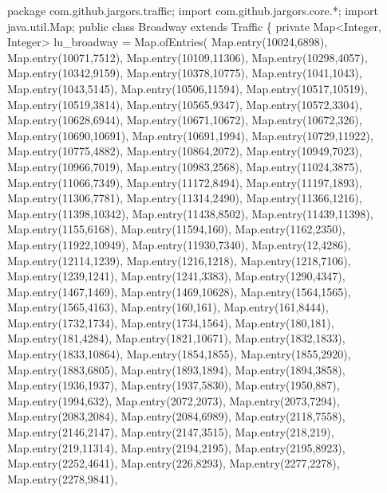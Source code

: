 \nwenddocs{}\endmoddef\nwstartdeflinemarkup\nwenddeflinemarkup
package com.github.jargors.traffic;
import com.github.jargors.core.*;
import java.util.Map;
public class Broadway extends Traffic \{
  private Map<Integer, Integer> lu_broadway = Map.ofEntries(
    Map.entry(10024,6898),
    Map.entry(10071,7512),
    Map.entry(10109,11306),
    Map.entry(10298,4057),
    Map.entry(10342,9159),
    Map.entry(10378,10775),
    Map.entry(1041,1043),
    Map.entry(1043,5145),
    Map.entry(10506,11594),
    Map.entry(10517,10519),
    Map.entry(10519,3814),
    Map.entry(10565,9347),
    Map.entry(10572,3304),
    Map.entry(10628,6944),
    Map.entry(10671,10672),
    Map.entry(10672,326),
    Map.entry(10690,10691),
    Map.entry(10691,1994),
    Map.entry(10729,11922),
    Map.entry(10775,4882),
    Map.entry(10864,2072),
    Map.entry(10949,7023),
    Map.entry(10966,7019),
    Map.entry(10983,2568),
    Map.entry(11024,3875),
    Map.entry(11066,7349),
    Map.entry(11172,8494),
    Map.entry(11197,1893),
    Map.entry(11306,7781),
    Map.entry(11314,2490),
    Map.entry(11366,1216),
    Map.entry(11398,10342),
    Map.entry(11438,8502),
    Map.entry(11439,11398),
    Map.entry(1155,6168),
    Map.entry(11594,160),
    Map.entry(1162,2350),
    Map.entry(11922,10949),
    Map.entry(11930,7340),
    Map.entry(12,4286),
    Map.entry(12114,1239),
    Map.entry(1216,1218),
    Map.entry(1218,7106),
    Map.entry(1239,1241),
    Map.entry(1241,3383),
    Map.entry(1290,4347),
    Map.entry(1467,1469),
    Map.entry(1469,10628),
    Map.entry(1564,1565),
    Map.entry(1565,4163),
    Map.entry(160,161),
    Map.entry(161,8444),
    Map.entry(1732,1734),
    Map.entry(1734,1564),
    Map.entry(180,181),
    Map.entry(181,4284),
    Map.entry(1821,10671),
    Map.entry(1832,1833),
    Map.entry(1833,10864),
    Map.entry(1854,1855),
    Map.entry(1855,2920),
    Map.entry(1883,6805),
    Map.entry(1893,1894),
    Map.entry(1894,3858),
    Map.entry(1936,1937),
    Map.entry(1937,5830),
    Map.entry(1950,887),
    Map.entry(1994,632),
    Map.entry(2072,2073),
    Map.entry(2073,7294),
    Map.entry(2083,2084),
    Map.entry(2084,6989),
    Map.entry(2118,7558),
    Map.entry(2146,2147),
    Map.entry(2147,3515),
    Map.entry(218,219),
    Map.entry(219,11314),
    Map.entry(2194,2195),
    Map.entry(2195,8923),
    Map.entry(2252,4641),
    Map.entry(226,8293),
    Map.entry(2277,2278),
    Map.entry(2278,9841),

